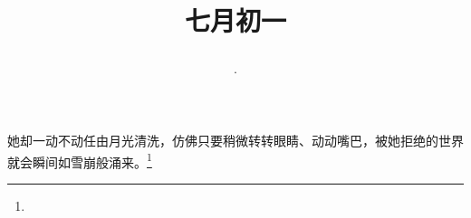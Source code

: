 \title{\date[d=4,m=8,y=2024][year:cn-y,年,month:cn,day:cn,日,·,weekday]·七月初一 }
她却一动不动任由月光清洗，仿佛只要稍微转转眼睛、动动嘴巴，被她拒绝的世界就会瞬间如雪崩般涌来。\footnote{ }

